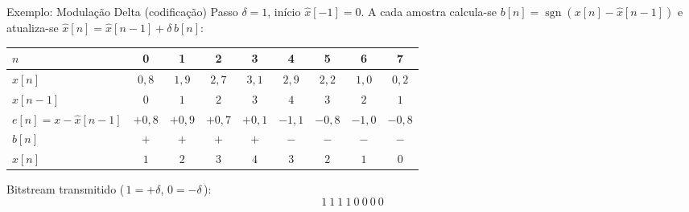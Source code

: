 \begin{frame}{Exemplo: Modulação Delta (codificação)}
  Passo $\delta = 1$, início $\hat{x}[-1] = 0$. A cada amostra calcula-se
  $b[n] = \operatorname{sgn}(x[n]-\hat{x}[n-1])$ e atualiza-se
  $\hat{x}[n] = \hat{x}[n-1] + \delta\,b[n]$:

  \vspace{0.15cm}
  \begin{center}
  \footnotesize
  \renewcommand{\arraystretch}{1.25}
  \begin{tabular}{l|cccccccc}
    $n$ & 0 & 1 & 2 & 3 & 4 & 5 & 6 & 7 \\
    \hline
    $x[n]$              & $0{,}8$ & $1{,}9$ & $2{,}7$ & $3{,}1$ & $2{,}9$ & $2{,}2$ & $1{,}0$ & $0{,}2$ \\
    $\hat{x}[n-1]$      & $0$ & $1$ & $2$ & $3$ & $4$ & $3$ & $2$ & $1$ \\
    $e[n] = x-\hat{x}[n-1]$ & $+0{,}8$ & $+0{,}9$ & $+0{,}7$ & $+0{,}1$ & $-1{,}1$ & $-0{,}8$ & $-1{,}0$ & $-0{,}8$ \\
    $b[n]$              & $+$ & $+$ & $+$ & $+$ & $-$ & $-$ & $-$ & $-$ \\
    $\hat{x}[n]$        & $1$ & $2$ & $3$ & $4$ & $3$ & $2$ & $1$ & $0$ \\
  \end{tabular}
  \end{center}

  \vspace{0.15cm}
  Bitstream transmitido (\,$1 = +\delta$,\; $0 = -\delta$\,):
  \[
    \boxed{\;1\ 1\ 1\ 1\ 0\ 0\ 0\ 0\;}
  \]
\end{frame}


